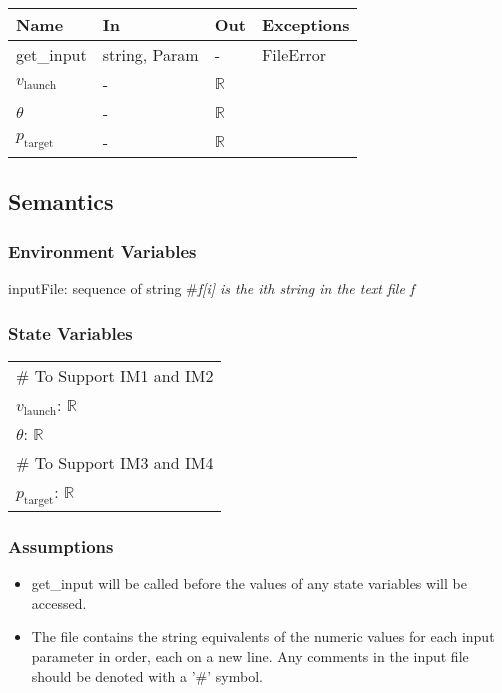 \documentclass[12pt, titlepage]{article}
\begin{document}
\begin{tabular}{p{3cm} p{3cm} p{1cm} >{\raggedright\arraybackslash}p{7cm}}
\toprule
\textbf{Name} & \textbf{In} & \textbf{Out} & \textbf{Exceptions} \\
\midrule
get\_input & string, Param & - &  FileError \\
$v_{\text{launch}}$ & - & $\mathbb{R}$\\
$\theta$ & - & $\mathbb{R}$\\
$p_{\text{target}}$ & - & $\mathbb{R}$\\
\bottomrule
\end{tabular}

\subsection{Semantics}

\subsubsection{Environment Variables}

inputFile: sequence of string \#\textit{f[i] is the ith string in the text file f}

\subsubsection{State Variables}

\renewcommand{\arraystretch}{1.2}
\begin{longtable*}[l]{l} 
\# To Support IM1 and IM2 \\
$v_{\text{launch}}$: $\mathbb{R}$\\
$\theta$: $\mathbb{R}$\\
\# To Support IM3 and IM4 \\
$p_{\text{target}}$: $\mathbb{R}$\\
\end{longtable*}

\subsubsection{Assumptions}

\begin{itemize}

\item get\_input will be called before the values of any state variables will 
be accessed.

\item The file contains the string equivalents of the numeric values for
each input parameter in order, each on a new line. Any comments in the input file 
should be denoted with a '\#' symbol.

\end{itemize}
\end{document}
